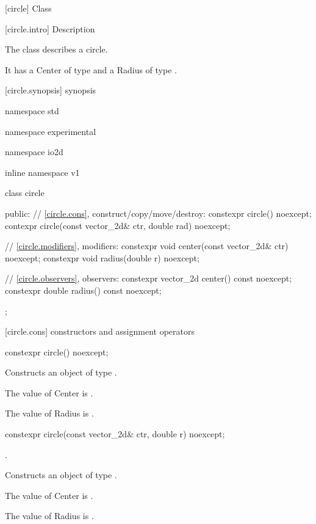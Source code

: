  [circle] {Class }

 [circle.intro] { Description}

\pnum
{}
The class  describes a circle.

\pnum
It has a Center of type  and a Radius of type .

 [circle.synopsis] { synopsis}

\begin{codeblock}
namespace std { namespace experimental { namespace io2d { inline namespace v1 {
  class circle {
  public:
    // \ref{circle.cons}, construct/copy/move/destroy:
    constexpr circle() noexcept;
    contexpr circle(const vector_2d& ctr, double rad) noexcept;

    // \ref{circle.modifiers}, modifiers:
    constexpr void center(const vector_2d& ctr) noexcept;
    constexpr void radius(double r) noexcept;
    
    // \ref{circle.observers}, observers:
    constexpr vector_2d center() const noexcept;
    constexpr double radius() const noexcept;
  };
} } } }
\end{codeblock}

 [circle.cons] { constructors and assignment operators}

\begin{itemdecl}
constexpr circle() noexcept;
\end{itemdecl}
\begin{itemdescr}
\pnum
\effects
Constructs an object of type .

\pnum
The value of Center is .

\pnum
The value of Radius is .
\end{itemdescr}

\begin{itemdecl}
constexpr circle(const vector_2d& ctr, double r) noexcept;
\end{itemdecl}
\begin{itemdescr}
\requires
{}.

\pnum
\effects
Constructs an object of type .

\pnum
The value of Center is .

\pnum
The value of Radius is .
\end{itemdescr}


